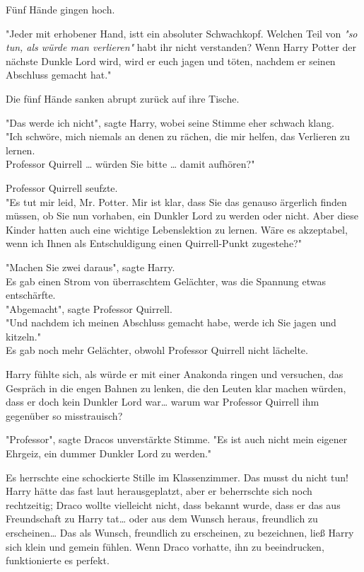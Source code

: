{Fünf Hände gingen hoch.

"Jeder mit erhobener Hand, istt ein absoluter Schwachkopf. Welchen Teil von \emph{"so tun, als würde man verlieren"} habt ihr nicht verstanden? Wenn Harry Potter der nächste Dunkle Lord wird, wird er euch jagen und töten, nachdem er seinen Abschluss gemacht hat."

Die fünf Hände sanken abrupt zurück auf ihre Tische.

"Das werde ich nicht", sagte Harry, wobei seine Stimme eher schwach klang.\\ "Ich schwöre, mich niemals an denen zu rächen, die mir helfen, das Verlieren zu lernen.\\ Professor Quirrell … würden Sie bitte … damit aufhören?"

Professor Quirrell seufzte.\\ "Es tut mir leid, Mr. Potter. Mir ist klar, dass Sie das genauso ärgerlich finden müssen, ob Sie nun vorhaben, ein Dunkler Lord zu werden oder nicht. Aber diese Kinder hatten auch eine wichtige Lebenslektion zu lernen. Wäre es akzeptabel, wenn ich Ihnen als Entschuldigung einen Quirrell-Punkt zugestehe?"

"Machen Sie zwei daraus", sagte Harry.\\ Es gab einen Strom von überraschtem Gelächter, was die Spannung etwas entschärfte.\\ "Abgemacht", sagte Professor Quirrell.\\ "Und nachdem ich meinen Abschluss gemacht habe, werde ich Sie jagen und kitzeln."\\ Es gab noch mehr Gelächter, obwohl Professor Quirrell nicht lächelte.

Harry fühlte sich, als würde er mit einer Anakonda ringen und versuchen, das Gespräch in die engen Bahnen zu lenken, die den Leuten klar machen würden, dass er doch kein Dunkler Lord war… warum war Professor Quirrell ihm gegenüber so misstrauisch?

"Professor", sagte Dracos unverstärkte Stimme. "Es ist auch nicht mein eigener Ehrgeiz, ein dummer Dunkler Lord zu werden."

Es herrschte eine schockierte Stille im Klassenzimmer. Das musst du nicht tun! Harry hätte das fast laut herausgeplatzt, aber er beherrschte sich noch rechtzeitig; Draco wollte vielleicht nicht, dass bekannt wurde, dass er das aus Freundschaft zu Harry tat… oder aus dem Wunsch heraus, freundlich zu erscheinen… Das als Wunsch, freundlich zu erscheinen, zu bezeichnen, ließ Harry sich klein und gemein fühlen. Wenn Draco vorhatte, ihn zu beeindrucken, funktionierte es perfekt.

}
